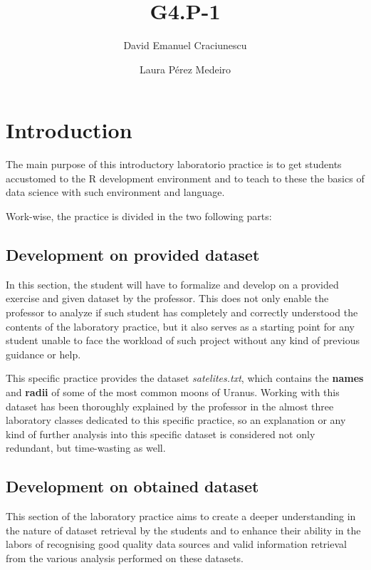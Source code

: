 \documentclass[a4paper]{article}
\title{G4.P-1}
\author{David Emanuel Craciunescu \and Laura Pérez Medeiro}
\begin{document}
\maketitle


\section*{Introduction}

The main purpose of this introductory laboratorio practice is to get students
accustomed to the R development environment and to teach to these the basics of
data science with such environment and language.

Work-wise, the practice is divided in the two following parts:

\subsection*{Development on provided dataset}
In this section, the student will have to formalize and develop on a provided
exercise and given dataset by the professor. This does not only enable the
professor to analyze if such student has completely and correctly understood the
contents of the laboratory practice, but it also serves as a starting point for
any student unable to face the workload of such project without any kind of
previous guidance or help.

This specific practice provides the dataset \textit{satelites.txt}, which
contains the \textbf{names} and \textbf{radii} of some of the most common moons
of Uranus. Working with this dataset has been thoroughly explained by the
professor in the almost three laboratory classes dedicated to this specific
practice, so an explanation or any kind of further analysis into this specific
dataset is considered not only redundant, but time-wasting as well.


\subsection*{Development on obtained dataset}

This section of the laboratory practice aims to create a deeper understanding in
the nature of dataset retrieval by the students and to enhance their ability in
the labors of recognising good quality data sources and valid information
retrieval from the various analysis performed on these datasets.
\end{document}
